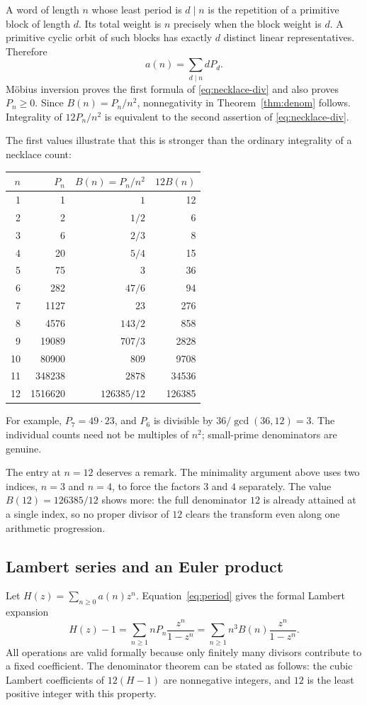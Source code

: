 \documentclass[11pt,a4paper]{article}
\numberwithin{equation}{section}
\theoremstyle{definition}
\theoremstyle{remark}
\begin{document}
A word of length $n$ whose least period is $d\mid n$ is the repetition of
a primitive block of length $d$. Its total weight is $n$ precisely when the
block weight is $d$. A primitive cyclic orbit of such blocks has exactly
$d$ distinct linear representatives. Therefore
\begin{equation}\label{eq:period}
 a(n)=\sum_{d\mid n}dP_d.
\end{equation}
M\"obius inversion proves the first formula of \eqref{eq:necklace-div} and
also proves $P_n\ge0$. Since $B(n)=P_n/n^2$, nonnegativity in
Theorem~\ref{thm:denom} follows. Integrality of $12P_n/n^2$ is equivalent
to the second assertion of \eqref{eq:necklace-div}.

The first values illustrate that this is stronger than the ordinary
integrality of a necklace count:
\begin{center}
\begin{tabular}{r r r r}
\toprule
$n$ & $P_n$ & $B(n)=P_n/n^2$ & $12B(n)$\\
\midrule
1&1&$1$&12\\
2&2&$1/2$&6\\
3&6&$2/3$&8\\
4&20&$5/4$&15\\
5&75&$3$&36\\
6&282&$47/6$&94\\
7&1127&$23$&276\\
8&4576&$143/2$&858\\
9&19089&$707/3$&2828\\
10&80900&$809$&9708\\
11&348238&$2878$&34536\\
12&1516620&$126385/12$&126385\\
\bottomrule
\end{tabular}
\end{center}
For example, $P_7=49\cdot23$, and $P_6$ is divisible by
$36/\gcd(36,12)=3$. The individual counts need not be multiples of $n^2$;
small-prime denominators are genuine.

The entry at $n=12$ deserves a remark. The minimality argument above uses
two indices, $n=3$ and $n=4$, to force the factors $3$ and $4$ separately.
The value $B(12)=126385/12$ shows more: the full denominator $12$ is already
attained at a single index, so no proper divisor of $12$ clears the
transform even along one arithmetic progression.

\subsection{Lambert series and an Euler product}
Let $H(z)=\sum_{n\ge0}a(n)z^n$. Equation~\eqref{eq:period} gives the formal
Lambert expansion
\begin{equation}\label{eq:Lambert}
 H(z)-1=\sum_{n\ge1}nP_n\frac{z^n}{1-z^n}
       =\sum_{n\ge1}n^3B(n)\frac{z^n}{1-z^n}.
\end{equation}
All operations are valid formally because only finitely many divisors
contribute to a fixed coefficient. The denominator theorem can be stated
as follows: the cubic Lambert coefficients of $12(H-1)$ are nonnegative
integers, and $12$ is the least positive integer with this property.
\end{document}
